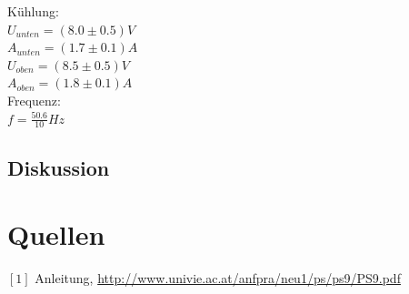 \documentclass[12pt,a4paper]{article}
\begin{document}
\begin{multicols}{2}
Kühlung:\\ 
$U_{unten} = (8.0 \pm 0.5)V$\\
$A_{unten} = (1.7 \pm 0.1)A$\\
$U_{oben} = (8.5 \pm 0.5)V$\\
$A_{oben} = (1.8 \pm 0.1)A$\\

Frequenz:\\
$f = \frac{50.6}{10} Hz$\\

\subsection{Diskussion}


\section{Quellen}
$[1]$ Anleitung, \url{http://www.univie.ac.at/anfpra/neu1/ps/ps9/PS9.pdf}\\

\end{multicols}
\end{document}
